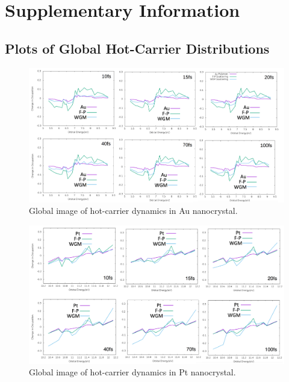 \documentclass[journal=jpclcd,manuscript=letter]{achemso}
\begin{document}
\section{Supplementary Information}

\subsection{Plots of Global Hot-Carrier Distributions}

\begin{figure}
\begin{center}
\includegraphics[width=6in]{figs/Au_HotElectronDistribution_Comparison.png}
\caption{Global image of hot-carrier dynamics in Au nanocrystal.}
\end{center}
\end{figure}


\begin{figure}
\begin{center}
\includegraphics[width=6in]{figs/Pt_HotElectronDistribution_Comparison.png}
\caption{Global image of hot-carrier dynamics in Pt nanocrystal.}
\end{center}
\end{figure}
\end{document}
